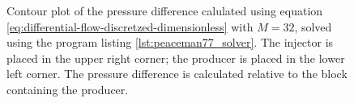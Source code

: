 \begin{figure}[htbp]
    \centering
    \scalebox{0.7}{}
    \caption{Contour plot of the pressure difference calulated using equation \eqref{eq:differential-flow-discretzed-dimensionless} with $M=32$, solved using the program listing \ref{lst:peaceman77_solver}. The injector is placed in the upper right corner; the producer is placed in the lower left corner. The pressure difference is calculated relative to the block containing the producer.}
    \label{fig:pressure_drop_contour}
\end{figure}


